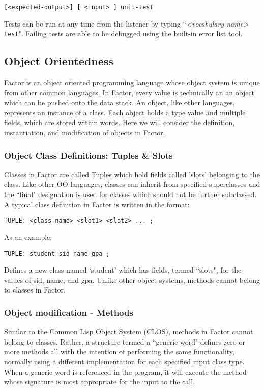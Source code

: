 \documentclass{sig-alternate}
\begin{document}
\begin{verbatim}
[<expected-output>] [ <input> ] unit-test
\end{verbatim}

Tests can be run at any time from the listener by typing ``\textit{<vocabulary-name>} \texttt{test}". Failing tests are able to be debugged using the built-in error list tool.\cite{UnitTesting}

\subsection{Object Orientedness}

Factor is an object oriented programming language whose object system is unique from other common languages. In Factor, every value is technically an an object which can be pushed onto the data stack. An object, like other languages, represents an instance of a class. \cite{FactorProgopedia} Each object holds a type value and multiple fields, which are stored within words. Here we will consider the definition, instantiation, and modification of objects in Factor.
 
\subsubsection{Object Class Definitions: Tuples \& Slots}
Classes in Factor are called Tuples which hold fields called 'slots' belonging to the class. Like other OO languages, classes can inherit from specified superclasses and the ``final" designation is used for classes which should not be further subclassed. A typical class definition in Factor is written in the format:

\begin{verbatim}
TUPLE: <class-name> <slot1> <slot2> ... ;
\end{verbatim}
As an example:

\begin{verbatim}
TUPLE: student sid name gpa ;
\end{verbatim}

Defines a new class named `student' which has fields, termed ``slots", for the values of sid, name, and gpa. Unlike other object systems, methods cannot belong to classes in Factor. \cite{ControlFlow}
 
\subsubsection{Object modification - Methods}
Similar to the Common Lisp Object System (CLOS), methods in Factor cannot belong to classes. Rather, a structure termed a ``generic word" defines zero or more methods all with the intention of performing the same functionality, normally using a different implementation for each specified input class type. When a generic word is referenced in the program, it will execute the method whose signature is most appropriate for the input to the call.\cite{WorkInProgress} 
\end{document}
